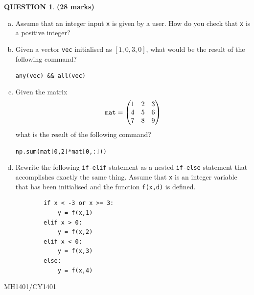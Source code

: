 \documentclass[a4paper,12pt]{article}
\theoremstyle{definition}
\newtheorem{ques}[dummy]{QUESTION}
\theoremstyle{plain}
\newcommand{\ttx}[1]{\texttt{#1}}
\begin{document}
\begin{ques}\hfill \textbf{(28 marks)}\\
	\begin{enumerate}[(a)]
		\item Assume that an integer input \texttt{x} is given by a user. How do you check that \ttx{x} is a positive integer?
		
		\item Given a vector \ttx{vec} initialised as $[1, 0, 3, 0]$, what would be the result of the following command?\vspace*{1em}
		
		\texttt{any(vec) \&\& all(vec)}
		
		\item Given the matrix\begin{equation*}
		\text{\ttx{mat}} = \begin{pmatrix*}
		1 & 2 & 3\\4 & 5 & 6\\7 & 8 & 9
		\end{pmatrix*}
		\end{equation*}
		what is the result of the following command?\vspace*{1em}
		
		\texttt{np.sum(mat[0,2]*mat[0,:]))}
		
		\item Rewrite the following \texttt{if-elif} statement as a nested \texttt{if-else} statement that accomplishes exactly the same thing. Assume that \texttt{x} is an integer variable that has been initialised and the function \texttt{f(x,d)} is defined.
		\begin{verbatim}
		if x < -3 or x >= 3:
		    y = f(x,1)
		elif x > 0:
		    y = f(x,2)
		elif x < 0:
		    y = f(x,3)
		else:
		    y = f(x,4)
		\end{verbatim}
	\end{enumerate}
\end{ques}

\newpage

\hfill MH1401/CY1401\vspace*{0.5em}
\end{document}

